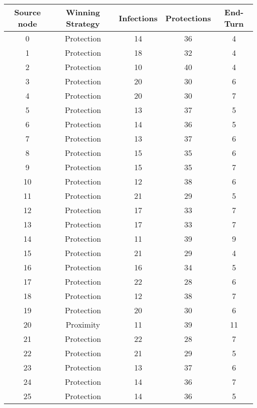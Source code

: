 \documentclass[results.tex]{subfiles}
\begin{document}
\begin{center}
  \begin{tabular}{| c || c | c | c | c |}
    \hline
    {\bfseries Source node} & {\bfseries Winning Strategy} & {\bfseries Infections} & {\bfseries Protections} & {\bfseries End-Turn} \\  %
    \hline\hline
    0 & Protection & 14 & 36 & 4 \\ 
    \hline
    1 & Protection & 18 & 32 & 4 \\ 
    \hline
    2 & Protection & 10 & 40 & 4 \\ 
    \hline
    3 & Protection & 20 & 30 & 6 \\ 
    \hline
    4 & Protection & 20 & 30 & 7 \\ 
    \hline
    5 & Protection & 13 & 37 & 5 \\ 
    \hline
    6 & Protection & 14 & 36 & 5 \\ 
    \hline
    7 & Protection & 13 & 37 & 6 \\ 
    \hline
    8 & Protection & 15 & 35 & 6 \\ 
    \hline
    9 & Protection & 15 & 35 & 7 \\ 
    \hline
    10 & Protection & 12 & 38 & 6 \\ 
    \hline
    11 & Protection & 21 & 29 & 5 \\ 
    \hline
    12 & Protection & 17 & 33 & 7 \\ 
    \hline
    13 & Protection & 17 & 33 & 7 \\ 
    \hline
    14 & Protection & 11 & 39 & 9 \\ 
    \hline
    15 & Protection & 21 & 29 & 4 \\ 
    \hline
    16 & Protection & 16 & 34 & 5 \\ 
    \hline
    17 & Protection & 22 & 28 & 6 \\ 
    \hline
    18 & Protection & 12 & 38 & 7 \\ 
    \hline
    19 & Protection & 20 & 30 & 6 \\ 
    \hline
    20 & Proximity & 11 & 39 & 11 \\ 
    \hline
    21 & Protection & 22 & 28 & 7 \\ 
    \hline
    22 & Protection & 21 & 29 & 5 \\ 
    \hline
    23 & Protection & 13 & 37 & 6 \\ 
    \hline
    24 & Protection & 14 & 36 & 7 \\ 
    \hline
    25 & Protection & 14 & 36 & 5 \\ 

\end{tabular}
\end{center}
\end{document}
